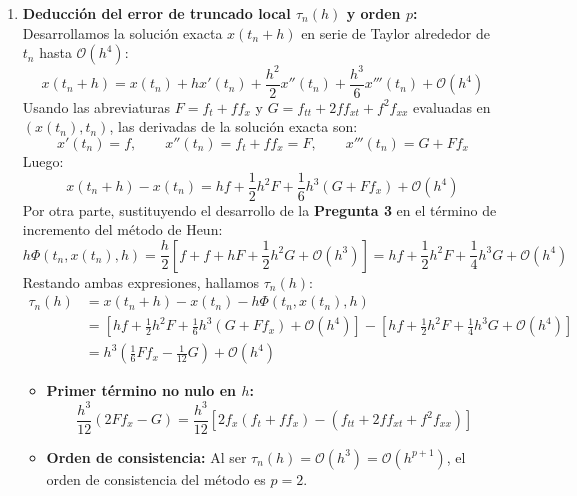 \begin{sol}
\begin{enumerate}
    \item \textbf{Deducción del error de truncado local $\tau_n(h)$ y orden $p$:}
    Desarrollamos la solución exacta $x(t_n + h)$ en serie de Taylor alrededor de $t_n$ hasta $\mathcal{O}(h^4)$:
    $$
    x(t_n + h) = x(t_n) + h x'(t_n) + \frac{h^2}{2} x''(t_n) + \frac{h^3}{6} x'''(t_n) + \mathcal{O}(h^4)
    $$
    Usando las abreviaturas $F = f_t + f f_x$ y $G = f_{tt} + 2 f f_{xt} + f^2 f_{xx}$ evaluadas en $(x(t_n), t_n)$, las derivadas de la solución exacta son:
    $$
    x'(t_n) = f, \qquad x''(t_n) = f_t + f f_x = F, \qquad x'''(t_n) = G + F f_x
    $$
    Luego:
    $$
    x(t_n + h) - x(t_n) = h f + \frac{1}{2} h^2 F + \frac{1}{6} h^3 (G + F f_x) + \mathcal{O}(h^4)
    $$
    Por otra parte, sustituyendo el desarrollo de la \textbf{Pregunta 3} en el término de incremento del método de Heun:
    $$
    h\Phi(t_n, x(t_n), h) = \frac{h}{2}\left[ f + f + h F + \frac{1}{2} h^2 G + \mathcal{O}(h^3) \right] = h f + \frac{1}{2} h^2 F + \frac{1}{4} h^3 G + \mathcal{O}(h^4)
    $$
    Restando ambas expresiones, hallamos $\tau_n(h)$:
    $$
    \begin{aligned}
        \tau_n(h) &= x(t_n + h) - x(t_n) - h\Phi(t_n, x(t_n), h) \\
        &= \left[ h f + \frac{1}{2} h^2 F + \frac{1}{6} h^3 (G + F f_x) + \mathcal{O}(h^4) \right] - \left[ h f + \frac{1}{2} h^2 F + \frac{1}{4} h^3 G + \mathcal{O}(h^4) \right] \\
        &= h^3 \left( \frac{1}{6} F f_x - \frac{1}{12} G \right) + \mathcal{O}(h^4)
    \end{aligned}
    $$
    \begin{itemize}
        \item \textbf{Primer término no nulo en $h$:}
        $$
        \frac{h^3}{12}\left(2 F f_x - G\right) = \frac{h^3}{12}\left[ 2 f_x(f_t + f f_x) - (f_{tt} + 2 f f_{xt} + f^2 f_{xx}) \right]
        $$
        \item \textbf{Orden de consistencia:} Al ser $\tau_n(h) = \mathcal{O}(h^3) = \mathcal{O}(h^{p+1})$, el orden de consistencia del método es \textbf{$p = 2$}.
    \end{itemize}


\end{enumerate}
\end{sol}
